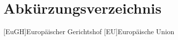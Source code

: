 \section*{Abkürzungsverzeichnis}

\begin{acronym}[EuGH]
[EuGH]{Europäischer Gerichtshof}
[EU]{Europäische Union}
\end{acronym}



\newpage